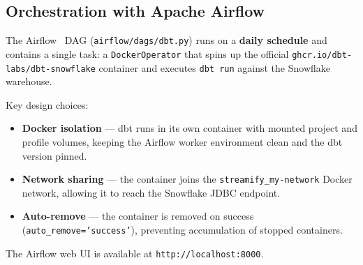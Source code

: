 \subsection{Orchestration with Apache Airflow}

The Airflow~\cite{airflow} DAG (\texttt{airflow/dags/dbt.py}) runs on a \textbf{daily schedule} and contains a
single task: a \texttt{DockerOperator} that spins up the official
\texttt{ghcr.io/dbt-labs/dbt-snowflake} container and executes \texttt{dbt run}
against the Snowflake warehouse.

Key design choices:
\begin{itemize}
  \item \textbf{Docker isolation} — dbt runs in its own container with mounted project and
        profile volumes, keeping the Airflow worker environment clean and the dbt version pinned.
  \item \textbf{Network sharing} — the container joins the \texttt{streamify\_my-network} Docker
        network, allowing it to reach the Snowflake JDBC endpoint.
  \item \textbf{Auto-remove} — the container is removed on success
        (\texttt{auto\_remove='success'}), preventing accumulation of stopped containers.
\end{itemize}

The Airflow web UI is available at \texttt{http://localhost:8000}.

